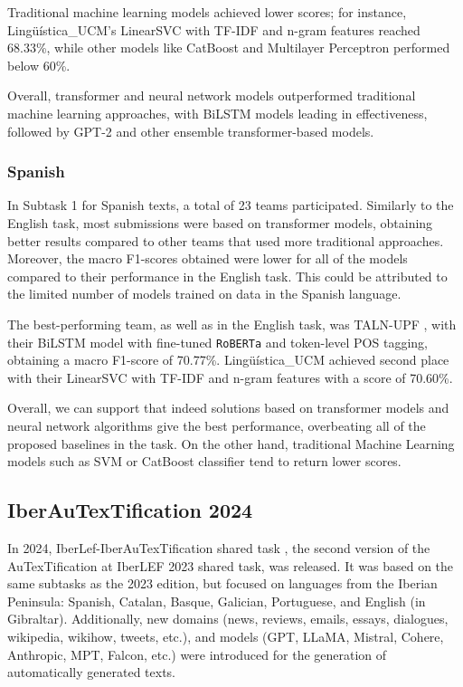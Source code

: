 \documentclass[a4paper,11pt,twocolumn,twoside]{article}
\begin{document}
Traditional machine learning models achieved lower scores; for instance, Lingüística\_UCM's \cite{linguistica-uc3m2023linearsvc} LinearSVC with TF-IDF and n-gram features reached 68.33\%, while other models like CatBoost and Multilayer Perceptron performed below 60\%. 

Overall, transformer and neural network models outperformed traditional machine learning approaches, with BiLSTM models leading in effectiveness, followed by GPT-2 and other ensemble transformer-based models.

\subsubsection{Spanish}
In Subtask 1 for Spanish texts, a total of 23 teams participated. Similarly to the English task, most submissions were based on transformer models, obtaining better results compared to other teams that used more traditional approaches. Moreover, the macro F1-scores obtained were lower for all of the models compared to their performance in the English task. This could be attributed to the limited number of models trained on data in the Spanish language.

The best-performing team, as well as in the English task, was TALN-UPF \cite{taln-upf2023bilstm}, with their BiLSTM model with fine-tuned \texttt{RoBERTa} and token-level POS tagging, obtaining a macro F1-score of 70.77\%. Lingüística\_UCM \cite{linguistica-uc3m2023linearsvc} achieved second place with their LinearSVC with TF-IDF and n-gram features with a score of 70.60\%.


Overall, we can support that indeed solutions based on transformer models and neural network algorithms give the best performance, overbeating all of the proposed baselines in the task.
On the other hand, traditional Machine Learning models such as SVM or CatBoost classifier tend to return lower scores.

\subsection{IberAuTexTification 2024}
In 2024, IberLef-IberAuTexTification shared task \cite{PLN6628}, the second version of the AuTexTification at IberLEF 2023 shared task, was released. It was based on the same subtasks as the 2023 edition, but focused on languages from the Iberian Peninsula: Spanish, Catalan, Basque, Galician, Portuguese, and English (in Gibraltar). Additionally, new domains (news, reviews, emails, essays, dialogues, wikipedia, wikihow, tweets, etc.), and models (GPT, LLaMA, Mistral, Cohere, Anthropic, MPT, Falcon, etc.) were introduced for the generation of automatically generated texts.
\end{document}
